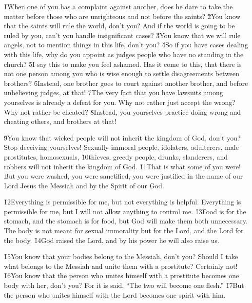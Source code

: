 \v{1}When one of you has a complaint against another, does he dare to take the matter before those who are unrighteous and not before the saints? \v{2}You know that the saints will rule the world, don't you? And if the world is going to be ruled by you, can't you handle insignificant cases? \v{3}You know that we will rule angels, not to mention things in this life, don't you? \v{4}So if you have cases dealing with this life, why do you appoint as judges people who have no standing in the church? \v{5}I say this to make you feel ashamed. Has it come to this, that there is not one person among you who is wise enough to settle disagreements between brothers? \v{6}Instead, one brother goes to court against another brother, and before unbelieving judges, at that! \v{7}The very fact that you have lawsuits among yourselves is already a defeat for you. Why not rather just accept the wrong? Why not rather be cheated? \v{8}Instead, you yourselves practice doing wrong and cheating others, and brothers at that!

\v{9}You know that wicked people will not inherit the kingdom of God, don't you? Stop deceiving yourselves! Sexually immoral people, idolaters, adulterers, male prostitutes, homosexuals, \v{10}thieves, greedy people, drunks, slanderers, and robbers will not inherit the kingdom of God. \v{11}That is what some of you were! But you were washed, you were sanctified, you were justified in the name of our Lord Jesus the Messiah and by the Spirit of our God.

\v{12}Everything is permissible for me, but not everything is helpful. Everything is permissible for me, but I will not allow anything to control me. \v{13}Food is for the stomach, and the stomach is for food, but God will make them both unnecessary. The body is not meant for sexual immorality but for the Lord, and the Lord for the body. \v{14}God raised the Lord, and by his power he will also raise us.

\v{15}You know that your bodies belong to the Messiah, don't you? Should I take what belongs to the Messiah and unite them with a prostitute? Certainly not! \v{16}You know that the person who unites himself with a prostitute becomes one body with her, don't you? For it is said, ``The two will become one flesh.'' \v{17}But the person who unites himself with the Lord becomes one spirit with him.

